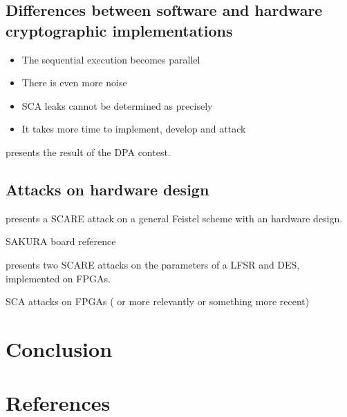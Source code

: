 \documentclass[11pt]{sdm}
\begin{document}
\subsection{Differences between software and hardware cryptographic implementations}

\begin{itemize}
    \item The sequential execution becomes parallel
    \item There is even more noise
    \item SCA leaks cannot be determined as precisely
    \item It takes more time to implement, develop and attack
\end{itemize}

\parencite{Clavier_Danger_Duc_Elaabid_Gérard_Guilley_Heuser_Kasper_Li_Lomné_et_al_2014} presents the result of the DPA contest.

\subsection{Attacks on hardware design}

\parencite{Réal_Dubois_Guilloux_Valette_Drissi_2008} presents a SCARE attack on a general Feistel scheme with an hardware design.

SAKURA board reference

\parencite{Guilley_Sauvage_Micolod_Réal_Valette_2010} presents two SCARE attacks on the parameters of a LFSR and DES, implemented on FPGAs.

SCA attacks on FPGAs (\parencite{Peeters_Standaert_Donckers_Quisquater_2005} or more relevantly \parencite{Standaert_Ors_Preneel_2004} or something more recent)


\section{Conclusion}

\section*{References}

\printbibliography
\end{document}
